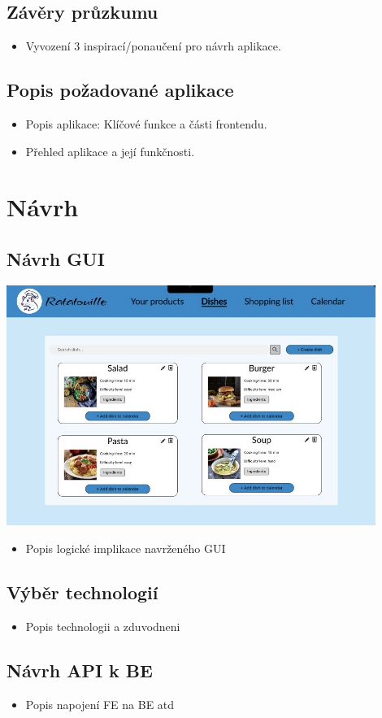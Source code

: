 \documentclass[a4paper,12pt]{article}
\begin{document}
\subsection*{Závěry průzkumu}
\begin{itemize}
    \item Vyvození 3 inspirací/ponaučení pro návrh aplikace.
\end{itemize}

\subsection*{Popis požadované aplikace}
\begin{itemize}
    \item Popis aplikace: Klíčové funkce a části frontendu.
    \item Přehled aplikace a její funkčnosti.
\end{itemize}

\section*{Návrh}
\subsection*{Návrh GUI}

\includegraphics[width=0.9\textwidth]{dishes.JPG}
\begin{itemize}
    \item Popis  logické implikace navrženého GUI
\end{itemize}


\subsection*{Výběr technologií}
\begin{itemize}
    \item Popis technologii a zduvodneni
\end{itemize}

\subsection*{Návrh API k BE}
\begin{itemize}
    \item Popis  napojení FE na BE atd
\end{itemize}
\end{document}
